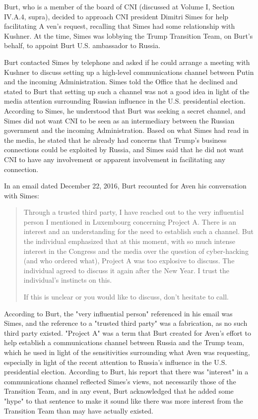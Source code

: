 Burt, who is a member of the board of CNI (discussed at Volume I, Section IV.A.4, supra),%
decided to approach CNI president Dimitri Simes for help facilitating A ven's request, recalling that Simes had some relationship with Kushner.%
At the time, Simes was lobbying the Trump Transition Team, on Burt's behalf, to appoint Burt U.S. ambassador to Russia.%

Burt contacted Simes by telephone and asked if he could arrange a meeting with Kushner to discuss setting up a high-level communications channel between Putin and the incoming Administration.%
Simes told the Office that he declined and stated to Burt that setting up such a channel was not a good idea in light of the media attention surrounding Russian influence in the U.S. presidential election.%
According to Simes, he understood that Burt was seeking a secret channel, and Simes did not want CNI to be seen as an intermediary between the Russian government and the incoming Administration.%
Based on what Simes had read in the media, he stated that he already had concerns that Trump's business connections could be exploited by Russia, and Simes said that he did not want CNI to have any involvement or apparent involvement in facilitating any connection.%

In an email dated December 22, 2016, Burt recounted for Aven his conversation with Simes:

\begin{quote}
Through a trusted third party, I have reached out to the very influential person I mentioned in Luxembourg concerning Project A.
There is an interest and an understanding for the need to establish such a channel.
But the individual emphasized that at this moment, with so much intense interest in the Congress and the media over the question of cyber-hacking (and who ordered what), Project A was too explosive to discuss.
The individual agreed to discuss it again after the New Year.
I trust the individual's instincts on this.

If this is unclear or you would like to discuss, don't hesitate to call.%
\end{quote}

According to Burt, the "very influential person" referenced in his email was Simes, and the reference to a "trusted third party" was a fabrication, as no such third party existed.
"Project A" was a term that Burt created for Aven's effort to help establish a communications channel between Russia and the Trump team, which he used in light of the sensitivities surrounding what Aven was requesting, especially in light of the recent attention to Russia's influence in the U.S. presidential election.%
According to Burt, his report that there was "interest" in a communications channel reflected Simes's views, not necessarily those of the Transition Team, and in any event, Burt acknowledged that he added some "hype" to that sentence to make it sound like there was more interest from the Transition Team than may have actually existed.%

